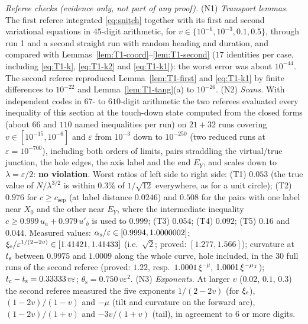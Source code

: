 \begin{remark}[Status]
\emph{Referee checks (evidence only, not part of any proof).} (N1) \emph{Transport lemmas.} The first referee integrated
\eqref{eq:snitch} together with its first and second variational equations in $45$-digit arithmetic, for
$v\in\{10^{-6},10^{-3},0.1,0.5\}$, through run 1 and a second straight run with random heading and duration, and compared with
Lemmas~\ref{lem:T1-coord}--\ref{lem:T1-second} ($17$ identities per case, including \eqref{eq:T1-k}, \eqref{eq:T1-k2} and
\eqref{eq:T1-k1}): the worst error was about $10^{-44}$. The second referee reproduced Lemma~\ref{lem:T1-first} and
\eqref{eq:T1-k1} by finite differences to $10^{-22}$ and Lemma~\ref{lem:T1-tang}(a) to $10^{-26}$.
(N2) \emph{Scans.} With independent codes in $67$- to $610$-digit arithmetic the two referees evaluated every inequality of this
section at the touch-down state computed from the closed forms (about $66$ and $110$ named inequalities per run) on $21+32$ runs covering $v\in[10^{-15},10^{-6}]$ and $\varepsilon$ from
$10^{-3}$ down to $10^{-250}$ (two reduced runs at $\varepsilon=10^{-700}$), including both orders of limits, pairs straddling the
virtual/true junction, the hole edges, the axis label and the end $E_Y$, and scales down to $\lambda=\varepsilon/2$: \textbf{no
violation}. Worst ratios of left side to right side: \textup{(T1)} $0.053$ (the true value of $N/\lambda^{3/2}$ is within $0.3\%$ of
$1/\sqrt{12}$ everywhere, as for a unit circle); \textup{(T2)} $0.976$ for $c\ge c_{\mathrm{sep}}$ (at label distance $0.0246$) and
$0.508$ for the pairs with one label near $X_0$ and the other near $E_Y$, where the intermediate inequality
$c\ge0.999\,u_a+0.979\,u'_b$ is used to $0.999$; \textup{(T3)} $0.054$; \textup{(T4)} $0.092$; \textup{(T5)} $0.16$ and $0.044$.
Measured values: $\alpha_{\mathrm s}/\varepsilon\in[0.9994,1.0000002]$; $\xi_{\mathrm e}/\varepsilon^{1/(2-2v)}\in[1.41421,1.41433]$ (i.e.\ $\sqrt2$; proved:
$[1.277,1.566]$); curvature at $t_{\mathrm s}$ between $0.9975$ and $1.0009$ along the whole curve, hole included, in the $30$ full runs of the second
referee (proved: $1.22$, resp.\ $1.0001\,\xi^{-\mu}$, $1.0001\,\xi^{-\mu_{\mathrm T}}$); $t_{\mathrm c}-t_{\mathrm s}=0.33333\,v\varepsilon$; $\theta_{\mathrm s}=0.750\,v\varepsilon^2$.
(N3) \emph{Exponents.} At larger $v$ ($0.02$, $0.1$, $0.3$) the second referee measured the five exponents $1/(2-2v)$ (for $\xi_{\mathrm e}$),
$(1-2v)/(1-v)$ and $-\mu$ (tilt and curvature on the forward arc), $(1-2v)/(1+v)$ and $-3v/(1+v)$ (tail), in agreement to $6$ or more
digits.


\end{remark}
